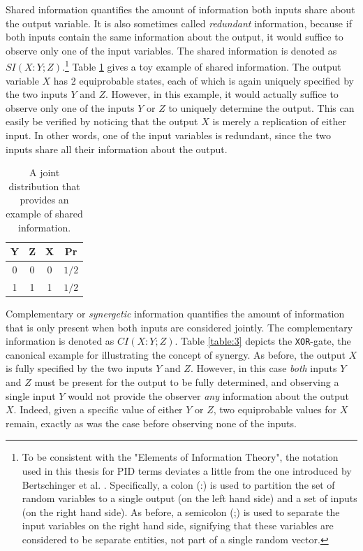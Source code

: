 \documentclass[12pt]{article}
\begin{document}
Shared information quantifies the amount of information both inputs share about the output variable. It is also sometimes called \textit{redundant} information, because if both inputs contain the same information about the output, it would suffice to observe only one of the input variables. The shared information is denoted as $SI(X:Y;Z)$.\footnote{To be consistent with the "Elements of Information Theory", the notation used in this thesis for PID terms deviates a little from the one introduced by Bertschinger et al. \cite{bertschinger}. Specifically, a colon (:) is used to partition the set of random variables to a single output (on the left hand side) and a set of inputs (on the right hand side). As before, a semicolon (;) is used to separate the input variables on the right hand side, signifying that these variables are considered to be separate entities, not part of a single random vector.} Table \ref{table:2} gives a toy example of shared information. The output variable $X$ has 2 equiprobable states, each of which is again uniquely specified by the two inputs $Y$ and $Z$. However, in this example, it would actually suffice to observe only one of the inputs $Y$ or $Z$ to uniquely determine the output. This can easily be verified by noticing that the output $X$ is merely a replication of either input. In other words, one of the input variables is redundant, since the two inputs share all their information about the output.

\begin{table}[h!]
\centering
\caption{A joint distribution that provides an example of shared information.}
\begin{tabular}{|c c |c|c|}
	\hline
	Y & Z & X & Pr\\ 
	\hline
	0 & 0 & 0 & $1/2$\\
	1 & 1 & 1 & $1/2$\\ 
	\hline
\end{tabular}
\label{table:2}
\end{table}

Complementary or \textit{synergetic} information quantifies the amount of information that is only present when both inputs are considered jointly. The complementary information is denoted as $CI(X:Y;Z)$. Table \ref{table:3} depicts the \texttt{XOR}-gate, the canonical example for illustrating the concept of synergy. As before, the output $X$ is fully specified by the two inputs $Y$ and $Z$. However, in this case \textit{both} inputs $Y$ and $Z$ must be present for the output to be fully determined, and observing a single input $Y$ would not provide the observer \textit{any} information about the output $X$. Indeed, given a specific value of either $Y$ or $Z$, two equiprobable values for $X$ remain, exactly as was the case before observing none of the inputs. 
\end{document}
